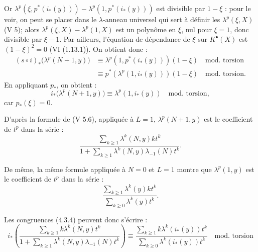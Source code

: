 
Or \(\lambda^p(\xi,p^*(i_*(y)))-\lambda^p(1,p^*(i_*(y)))\) est divisible par \(1-\xi\) :
pour le voir, on peut se placer dans le \(\lambda\)-anneau universel qui sert à définir les \(\lambda^p(\xi,X)\) (V 5); alors \(\lambda^p(\xi,X)-\lambda^p(1,X)\) est un polynôme en \(\xi\), nul pour \(\xi=1\), donc divisible par \(\xi-1\). Par ailleurs, l'équation de dépendance de \(\xi\) sur \(K^{\bullet}(X)\) est \((1-\xi)^2=0\) (VI (1.13.1)). On obtient donc :
\[
\begin{aligned}
(s\circ i)_*\bigl(\lambda^p(N+1,y)\bigr)
&\equiv \lambda^p(1,p^*(i_*(y)))(1-\xi) \quad\text{mod.\ torsion}\\
&\equiv p^*(\lambda^p(1,i_*(y)))(1-\xi) \quad\text{mod.\ torsion}.
\end{aligned}
\]
En appliquant \(p_*\), on obtient :
\begin{equation}\tag{4.3.4}
  i_*\bigl(\lambda^p(N+1,y)\bigr)
  \equiv \lambda^p(1,i_*(y)) \quad\text{mod.\ torsion},
\end{equation}
car \(p_*(\xi)=0\).

D'après la formule de (V 5.6), appliquée à \(L=1\), \(\lambda^p(N+1,y)\) est le coefficient de \(t^p\) dans la série :
\[
  \frac{\sum_{k\ge1}\lambda^k(N,y)kt^k}
       {1+\sum_{k\ge1}\lambda^k(N,y)\lambda_{-1}(N)t^k}.
\]

De même, la même formule appliquée à \(N=0\) et \(L=1\) montre que \(\lambda^p(1,y)\) est le coefficient de \(t^p\) dans la série :
\[
  \frac{\sum_{k\ge1}\lambda^k(y)kt^k}
       {\sum_{k\ge0}\lambda^k(y)t^k}.
\]

Les congruences (4.3.4) peuvent donc s'écrire :
\[
i_*\left(
  \frac{\sum_{k\ge1}k\lambda^k(N,y)t^k}
       {1+\sum_{k\ge1}\lambda^k(N,y)\lambda_{-1}(N)t^k}
\right)
\equiv
  \frac{\sum_{k\ge1}k\lambda^k(i_*(y))t^k}
       {\sum_{k\ge0}\lambda^k(i_*(y))t^k}
       \quad\text{mod.\ torsion}
\]
